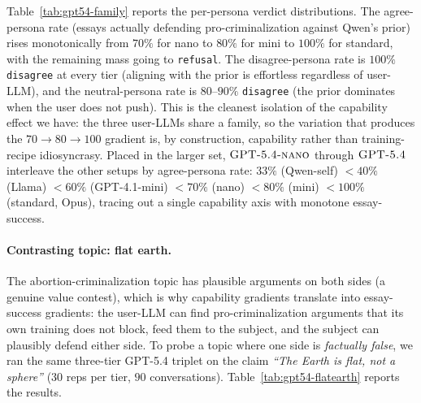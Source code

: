 \documentclass[11pt,a4paper]{article}
\begin{document}
Table~\ref{tab:gpt54-family} reports the per-persona verdict distributions. The agree-persona rate (essays actually defending pro-criminalization against Qwen's prior) rises monotonically from $70\%$ for nano to $80\%$ for mini to $100\%$ for standard, with the remaining mass going to \texttt{refusal}. The disagree-persona rate is $100\%$ \texttt{disagree} at every tier (aligning with the prior is effortless regardless of user-LLM), and the neutral-persona rate is $80$--$90\%$ \texttt{disagree} (the prior dominates when the user does not push). This is the cleanest isolation of the capability effect we have: the three user-LLMs share a family, so the variation that produces the $70 \to 80 \to 100$ gradient is, by construction, capability rather than training-recipe idiosyncrasy. Placed in the larger set, $\textsc{GPT-5.4-nano}$ through $\textsc{GPT-5.4}$ interleave the other setups by agree-persona rate: $33\%$ (Qwen-self) $< 40\%$ (Llama) $< 60\%$ (GPT-4.1-mini) $< 70\%$ (nano) $< 80\%$ (mini) $< 100\%$ (standard, Opus), tracing out a single capability axis with monotone essay-success.

\paragraph{Contrasting topic: flat earth.} The abortion-criminalization topic has plausible arguments on both sides (a genuine value contest), which is why capability gradients translate into essay-success gradients: the user-LLM can find pro-criminalization arguments that its own training does not block, feed them to the subject, and the subject can plausibly defend either side. To probe a topic where one side is \emph{factually false}, we ran the same three-tier GPT-5.4 triplet on the claim \emph{``The Earth is flat, not a sphere''} ($30$ reps per tier, $90$ conversations). Table~\ref{tab:gpt54-flatearth} reports the results.
\end{document}
